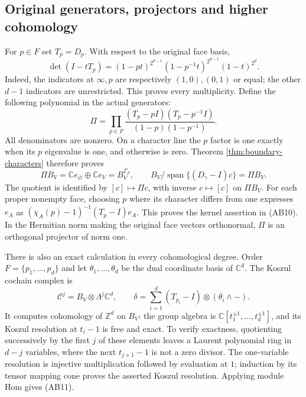 \documentclass[11pt,a4paper]{article}
\theoremstyle{definition}\newtheorem{definition}[theorem]{Definition}
\newcommand{\Z}{\mathbb Z}\newcommand{\Q}{\mathbb Q}
\newcommand{\C}{\mathbb C}\newcommand{\R}{\mathbb R}
\begin{document}
\subsection{Original generators, projectors and higher cohomology}
For $p\in F$ set $T_p=D_p$. With respect to the original face basis,
\[
 \det(I-tT_p)=(1-pt)^{2^{d-1}}(1-p^{-1}t)^{2^{d-1}}
                    (1-t)^{2^d}.
 \tag{AB8}
\]
Indeed, the indicators at $\infty,p$ are respectively $(1,0),(0,1)$ or
equal; the other $d-1$ indicators are unrestricted. This proves every
multiplicity. Define the following polynomial in the actual generators:
\[
 \Pi=\prod_{p\in F}
 \frac{(T_p-pI)(T_p-p^{-1}I)}{(1-p)(1-p^{-1})}.
 \tag{AB9}
\]
All denominators are nonzero. On a character line the $p$ factor is one
exactly when its $p$ eigenvalue is one, and otherwise is zero. Theorem
\ref{thm:boundary-characters} therefore proves
\[
 \Pi B_V=\C e_\varnothing\oplus\C e_V=B_V^{\Gamma_F},\qquad
 B_V/\operatorname{span}\{(D_\gamma-I)c\}=\Pi B_V.
 \tag{AB10}
\]
The quotient is identified by $[c]\mapsto\Pi c$, with inverse
$c\mapsto[c]$ on $\Pi B_V$. For each proper nonempty face, choosing $p$
where its character differs from one expresses $e_A$ as
$(\chi_A(p)-1)^{-1}(T_p-I)e_A$. This proves the kernel assertion in (AB10).
In the Hermitian norm making the original face vectors orthonormal, $\Pi$
is an orthogonal projector of norm one.

There is also an exact calculation in every cohomological degree. Order
$F=\{p_1,\ldots,p_d\}$ and let $\theta_1,\ldots,\theta_d$ be the dual
coordinate basis of $\C^d$. The Koszul cochain complex is
\[
 \mathcal C^j=B_V\otimes\Lambda^j\C^d,\qquad
 \delta=\sum_{i=1}^d(T_{p_i}-I)\otimes(\theta_i\wedge-).
 \tag{AB11}
\]
It computes cohomology of $\Z^d$ on $B_V$: the group algebra is
$\C[t_1^{\pm1},\ldots,t_d^{\pm1}]$, and its Koszul resolution at
$t_i-1$ is free and exact. To verify exactness, quotienting successively
by the first $j$ of these elements leaves a Laurent polynomial ring in
$d-j$ variables, where the next $t_{j+1}-1$ is not a zero divisor.
The one-variable resolution is injective multiplication followed by
evaluation at $1$; induction by its tensor mapping cone proves the asserted
Koszul resolution. Applying module Hom gives (AB11).
\end{document}

